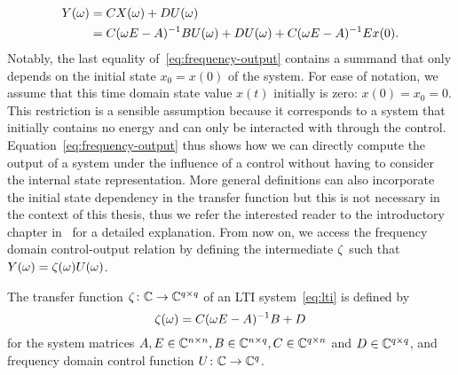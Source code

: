 \begin{equation}\label{eq:frequency-output}
    \begin{aligned}
        Y(\omega) &= C X(\omega) + D U(\omega) \\
        &= C (\omega E - A)\inv B U(\omega) + D U(\omega) + C (\omega E - A)\inv E x(0).
    \end{aligned}
\end{equation}
Notably, the last equality of~\eqref{eq:frequency-output} contains a summand that only depends on the initial state $x_0 = x(0)$ of the system.
For ease of notation, we assume that this time domain state value $x(t)$ initially is zero: $x(0) = x_0 = 0$.
This restriction is a sensible assumption because it corresponds to a system that initially contains no energy and can only be interacted with through the control.
Equation~\eqref{eq:frequency-output} thus shows how we can directly compute the output of a system under the influence of a control without having to consider the internal state representation.
More general definitions can also incorporate the initial state dependency in the transfer function but this is not necessary in the context of this thesis, thus we refer the interested reader to the introductory chapter in~\cite{Benner2017} for a detailed explanation.
From now on, we access the frequency domain control-output relation by defining the intermediate $\zeta$ such that $Y(\omega) = \zeta(\omega) U(\omega)$.

\begin{definition}\label{def:transfer-function}
    The transfer function $\zeta \colon \mathbb{C} \to \mathbb{C}^{q \times q}$ of an \ac{LTI} system~\eqref{eq:lti} is defined by
    \begin{equation}\label{eq:transfer-function}
        \tfunc(\omega) = C (\omega E - A)\inv B + D
    \end{equation}
    for the system matrices $A, E \in \mathbb{C}^{n \times n}, B \in \mathbb{C}^{n \times q}, C \in \mathbb{C}^{q \times n}$ and $D \in \mathbb{C}^{q \times q}$, and frequency domain control function $U \colon \mathbb{C} \to \mathbb{C}^{q}$.
\end{definition}

